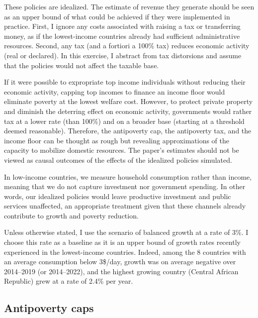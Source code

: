 \documentclass[12pt,english]{article}
\begin{document}
These policies are idealized. The estimate of revenue they generate should be seen as an upper bound of what could be achieved if they were implemented in practice. 
First, I ignore any costs associated with raising a tax or transferring money, as if the lowest-income countries already had sufficient administrative resources. Second, any tax (and a fortiori a 100\% tax) reduces economic activity (real or declared). In this exercise, I abstract from tax distorsions and assume that the policies would not affect the taxable base.%

If it were possible to expropriate top income individuals 
without reducing their economic activity, capping top incomes to finance an income floor would eliminate poverty at the lowest welfare cost. 
However, to protect private property and diminish the deterring effect on economic activity, governments would rather tax at a lower rate (than 100\%) and on a broader base (starting at a threshold deemed reasonable). 
Therefore, the antipoverty cap, the antipoverty tax, and the income floor can be thought as rough but revealing approximations of the capacity to mobilize domestic resources. The paper's estimates should not be viewed as causal outcomes of the effects of the idealized policies simulated.

In low-income countries, we measure household consumption rather than income, meaning that we do not capture investment nor government spending. In other words, our idealized policies would leave productive investment and public services unaffected, an appropriate treatment given that these channels already contribute to growth and poverty reduction.%

Unless otherwise stated, I use the scenario of balanced growth at a rate of 3\%. I choose this rate as a baseline as it is an upper bound of growth rates recently experienced in the lowest-income countries. Indeed, among the 8 countries with an average consumption below 3\$/day, growth was on average negative over 2014--2019 (or 2014--2022), and the highest growing country (Central African Republic) grew at a rate of 2.4\% per year. %

\subsection{Antipoverty caps\label{subsec:cap}}
\end{document}
